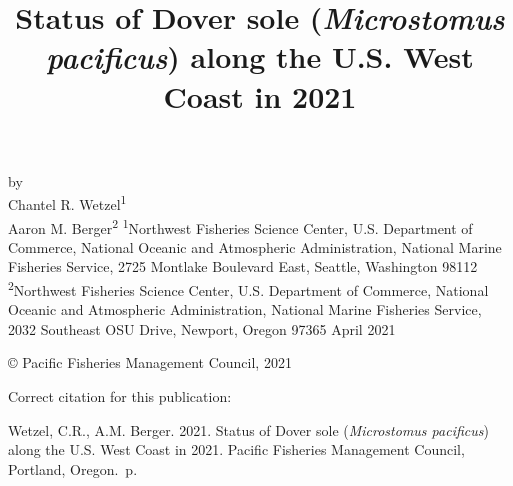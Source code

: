 \documentclass[11pt,
  english,
  a4paper,
]{article}
\date{}
\newcommand{\trTitle}{Status of Dover sole (\emph{Microstomus pacificus}) along the U.S. West Coast in 2021}
\newcommand{\trYear}{2021}
\newcommand{\trMonth}{April}
\newcommand{\trAuthsBack}{Wetzel, C.R., A.M. Berger}
\newcommand{\trCitation}{
\begin{hangparas}{1em}{1}
\trAuthsBack{}. \trYear{}. \trTitle{}. Pacific Fisheries Management Council, Portland, Oregon. \pageref{LastPage}{}\,p.
\end{hangparas}}
\begin{document}

\renewcommand*{\thefootnote}{\fnsymbol{footnote}}

\small
\thispagestyle{empty}
\noindent
\begin{center}
\title{Status of Dover sole (\emph{Microstomus pacificus}) along the U.S. West Coast in 2021}
\vspace{1.5cm}
{\Large\textbf{}}
\vfill
by\\
Chantel R. Wetzel\textsuperscript{1}\\
Aaron M. Berger\textsuperscript{2}\vfill
\textsuperscript{1}Northwest Fisheries Science Center, U.S. Department of Commerce, National Oceanic and Atmospheric Administration, National Marine Fisheries Service, 2725 Montlake Boulevard East, Seattle, Washington 98112\\
\textsuperscript{2}Northwest Fisheries Science Center, U.S. Department of Commerce, National Oceanic and Atmospheric Administration, National Marine Fisheries Service, 2032 Southeast OSU Drive, Newport, Oregon 97365\vfill
\trMonth{} \trYear{}
\end{center}
\clearpage

\thispagestyle{empty}
\vspace*{\fill}
\begin{center}
\copyright{} Pacific Fisheries Management Council, \trYear{}\\
\end{center}
\par
\bigskip
\noindent
Correct citation for this publication:
\bigskip
\par
\trCitation{}
\clearpage


\tableofcontents\clearpage
\listoffigures \listoftables \clearpage
\label{TRlastRoman}
\clearpage

\newpage
\thispagestyle{empty} %

\pagestyle{plain}  %
\renewcommand*{\thefootnote}{\arabic{footnote}}  %
\setcounter{footnote}{0}  %
\renewcommand{\headrulewidth}{0.5pt}
\renewcommand{\footrulewidth}{0.5pt}
\end{document}
